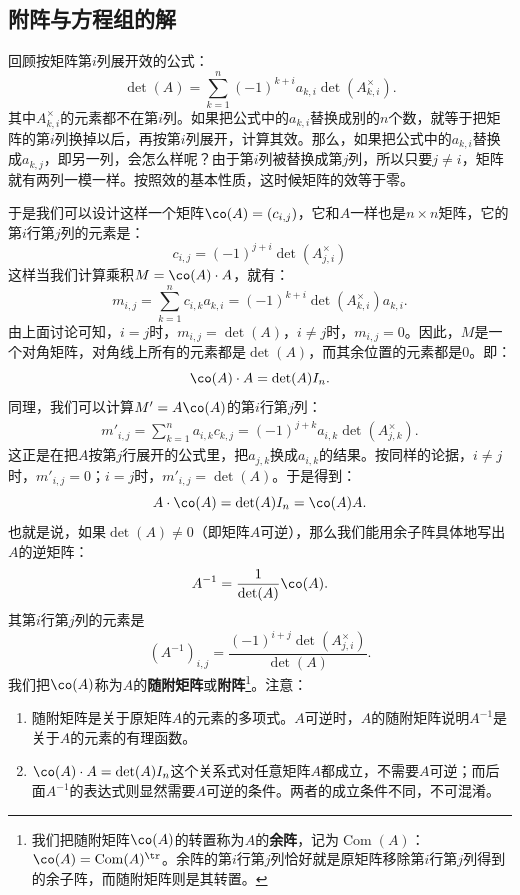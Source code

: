 \documentclass[12pt,UTF8]{ctexbook}
\begin{document}
\subsection{附阵与方程组的解}

回顾按矩阵第$i$列展开效的公式：
$$
\det(A) = \sum_{k=1}^n (-1)^{k+i} a_{k,i} \det(A_{k,i}^{\times}).
$$
其中$A_{k,i}^{\times}$的元素都不在第$i$列。如果把公式中的$a_{k,i}$替换成别的$n$个数，就等于把矩阵的第$i$列换掉以后，再按第$i$列展开，计算其效。那么，如果把公式中的$a_{k,i}$替换成$a_{k,j}$，即另一列，会怎么样呢？由于第$i$列被替换成第$j$列，所以只要$j\neq i$，矩阵就有两列一模一样。按照效的基本性质，这时候矩阵的效等于零。

于是我们可以设计这样一个矩阵$\co(A) = (c_{i,j})$，它和$A$一样也是$n\times n$矩阵，它的第$i$行第$j$列的元素是：
$$
c_{i,j} = (-1)^{j+i} \det(A_{j,i}^{\times})
$$
这样当我们计算乘积$M = \co(A)\cdot A$，就有：
$$
m_{i,j} = \sum_{k=1}^n c_{i,k} a_{k,i} = (-1)^{k+i} \det(A_{k,i}^{\times}) a_{k,i}.
$$
由上面讨论可知，$i=j$时，$m_{i,j} = \det(A)$，$i\neq j$时，$m_{i,j} = 0$。因此，$M$是一个对角矩阵，对角线上所有的元素都是$\det(A)$，而其余位置的元素都是$0$。即：
$$
\co(A)\cdot A = \det(A)I_n.
$$
同理，我们可以计算$M' = A\co(A)$的第$i$行第$j$列：
\begin{align*}
    m'_{i,j} = \sum_{k=1}^n a_{i,k} c_{k,j} = (-1)^{j+k}a_{i,k} \det(A_{j,k}^{\times}) .
\end{align*}
这正是在把$A$按第$j$行展开的公式里，把$a_{j,k}$换成$a_{i,k}$的结果。按同样的论据，$i\neq j$时，$m'_{i,j}=0$；$i=j$时，$m'_{i,j} = \det(A)$。于是得到：
$$
A\cdot \co(A) = \det(A)I_n = \co(A)A.
$$
也就是说，如果$\det(A)\neq 0$（即矩阵$A$可逆），那么我们能用余子阵具体地写出$A$的逆矩阵：
$$
A^{-1} = \frac{1}{\det(A)}\co(A).
$$
其第$i$行第$j$列的元素是
$$\left(A^{-1}\right)_{i,j} = \frac{(-1)^{i+j} \det(A_{j,i}^{\times})}{\det(A)}.$$
我们把$\co(A)$称为$A$的\textbf{随附矩阵}或\textbf{附阵}\footnote{我们把随附矩阵$\co(A)$的转置称为$A$的\textbf{余阵}，记为$\operatorname{Com}(A)$：$\co(A) = \operatorname{Com}(A)^{\tr}$。余阵的第$i$行第$j$列恰好就是原矩阵移除第$i$行第$j$列得到的余子阵，而随附矩阵则是其转置。}。注意：
\begin{enumerate}
    \item 随附矩阵是关于原矩阵$A$的元素的多项式。$A$可逆时，$A$的随附矩阵说明$A^{-1}$是关于$A$的元素的有理函数。
    \item $\co(A)\cdot A = \det(A)I_n$这个关系式对任意矩阵$A$都成立，不需要$A$可逆；而后面$A^{-1}$的表达式则显然需要$A$可逆的条件。两者的成立条件不同，不可混淆。
\end{enumerate}
\end{document}
